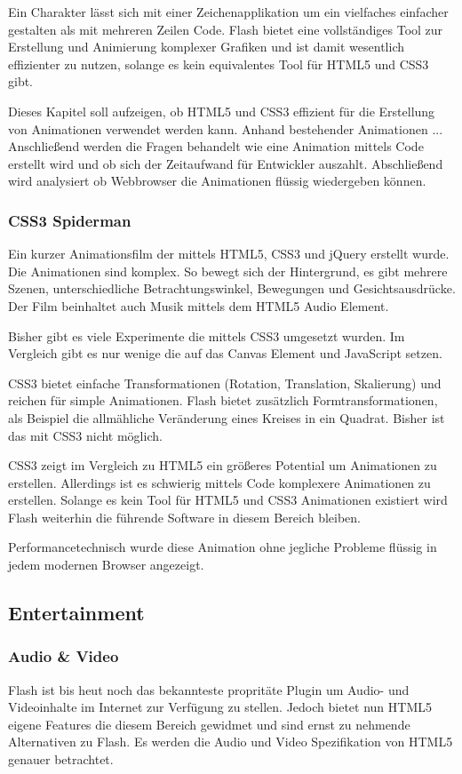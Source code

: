 Ein Charakter lässt sich mit einer Zeichenapplikation um ein vielfaches
einfacher gestalten als mit mehreren Zeilen Code. Flash bietet eine
vollständiges Tool zur Erstellung und Animierung komplexer Grafiken und ist
damit wesentlich effizienter zu nutzen, solange es kein equivalentes Tool für
HTML5 und CSS3 gibt.

Dieses Kapitel soll aufzeigen, ob HTML5 und CSS3 effizient für die Erstellung
von Animationen verwendet werden kann. Anhand bestehender Animationen ...
Anschließend werden die Fragen behandelt wie eine Animation mittels Code
erstellt wird und ob sich der Zeitaufwand für Entwickler auszahlt. Abschließend
wird analysiert ob Webbrowser die Animationen flüssig wiedergeben können.

\subsubsection{CSS3 Spiderman}
Ein kurzer Animationsfilm der mittels HTML5, CSS3 und jQuery erstellt wurde. Die
Animationen sind komplex. So bewegt sich der Hintergrund, es gibt mehrere
Szenen, unterschiedliche Betrachtungswinkel, Bewegungen und Gesichtsausdrücke.
Der Film beinhaltet auch Musik mittels dem HTML5 Audio Element.

Bisher gibt es viele Experimente die mittels CSS3 umgesetzt wurden. Im Vergleich
gibt es nur wenige die auf das Canvas Element und JavaScript setzen.

CSS3 bietet einfache Transformationen (Rotation, Translation, Skalierung) und
reichen für simple Animationen. Flash bietet zusätzlich Formtransformationen,
als Beispiel die allmähliche Veränderung eines Kreises in ein Quadrat. Bisher
ist das mit CSS3 nicht möglich.

CSS3 zeigt im Vergleich zu HTML5 ein größeres Potential um Animationen zu
erstellen. Allerdings ist es schwierig mittels Code komplexere Animationen zu
erstellen. Solange es kein Tool für HTML5 und CSS3 Animationen existiert wird
Flash weiterhin die führende Software in diesem Bereich bleiben.

Performancetechnisch wurde diese Animation ohne jegliche Probleme flüssig in
jedem modernen Browser angezeigt.

\subsection{Entertainment}

\subsubsection{Audio \& Video}
Flash ist bis heut noch das bekannteste propritäte Plugin um Audio- und
Videoinhalte im Internet zur Verfügung zu stellen. Jedoch bietet nun HTML5
eigene Features die diesem Bereich gewidmet und sind ernst zu nehmende
Alternativen zu Flash. Es werden die Audio und Video Spezifikation von HTML5
genauer betrachtet.

